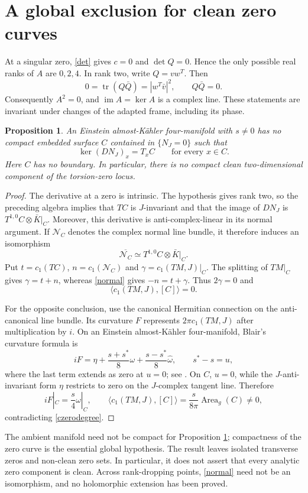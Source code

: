 \documentclass[11pt]{article}
\newtheorem{proposition}{Proposition}
\newcommand{\tr}{\operatorname{tr}}
\begin{document}
\section{A global exclusion for clean zero curves}
At a singular zero, \eqref{det} gives $c=0$ and $\det Q=0$. Hence the only possible real ranks of $A$ are $0,2,4$. In rank two, write $Q=v w^T$. Then
\[
0=\tr(Q\bar Q)=|w^T\bar v|^2,
\qquad Q\bar Q=0.
\]
Consequently $A^2=0$, and $\operatorname{im}A=\ker A$ is a complex line. These statements are invariant under changes of the adapted frame, including its phase.

\begin{proposition}\label{clean}
An Einstein almost-K\"ahler four-manifold with $s\ne0$ has no compact embedded surface $C$ contained in $\{N_J=0\}$ such that
\[
\ker (DN_J)_x=T_xC\qquad\text{for every }x\in C.
\]
Here $C$ has no boundary. In particular, there is no compact clean two-dimensional component of the torsion-zero locus.
\end{proposition}
\begin{proof}
The derivative at a zero is intrinsic. The hypothesis gives rank two, so the preceding algebra implies that $TC$ is $J$-invariant and that the image of $DN_J$ is $T^{1,0}C\otimes\bar K|_C$. Moreover, this derivative is anti-complex-linear in its normal argument. If $\mathcal N_C$ denotes the complex normal line bundle, it therefore induces an isomorphism
\begin{equation}\label{normal}
\overline{\mathcal N_C}\simeq T^{1,0}C\otimes\bar K|_C.
\end{equation}
Put $t=c_1(TC)$, $n=c_1(\mathcal N_C)$ and $\gamma=c_1(TM,J)|_C$. The splitting of $TM|_C$ gives $\gamma=t+n$, whereas \eqref{normal} gives $-n=t+\gamma$. Thus $2\gamma=0$ and
\begin{equation}\label{czerodegree}
\langle c_1(TM,J),[C]\rangle=0.
\end{equation}

For the opposite conclusion, use the canonical Hermitian connection on the anti-canonical line bundle. Its curvature $F$ represents $2\pi c_1(TM,J)$ after multiplication by $i$. On an Einstein almost-K\"ahler four-manifold, Blair's curvature formula is
\[
iF=\eta+\frac{s+s^*}{8}\omega+\frac{s-s^*}{8}\widehat\omega,
\qquad s^*-s=u,
\]
where the last term extends as zero at $u=0$; see \cite[Proposition 2.1]{Minimality}. On $C$, $u=0$, while the $J$-anti-invariant form $\eta$ restricts to zero on the $J$-complex tangent line. Therefore
\[
iF|_C=\frac s4\omega|_C,\qquad
\langle c_1(TM,J),[C]\rangle
=\frac{s}{8\pi}\operatorname{Area}_g(C)\ne0,
\]
contradicting \eqref{czerodegree}.
\end{proof}
The ambient manifold need not be compact for Proposition \ref{clean}; compactness of the zero curve is the essential global hypothesis. The result leaves isolated transverse zeros and non-clean zero sets. In particular, it does not assert that every analytic zero component is clean. Across rank-dropping points, \eqref{normal} need not be an isomorphism, and no holomorphic extension has been proved.
\end{document}
